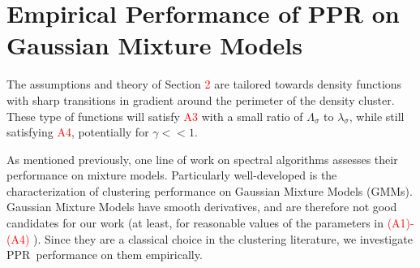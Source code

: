 \documentclass{article}
\newcommand{\1}{\mathbf{1}}
\newcommand{\pprspace}{{\sc PPR~}}
\theoremstyle{aldenthm}
\theoremstyle{aldenrmrk}
\begin{document}

\printAffiliationsAndNotice{}

\section{Empirical Performance of PPR on Gaussian Mixture Models}

The assumptions and theory of Section \textcolor{red}{2} are tailored towards density functions with sharp transitions in gradient around the perimeter of the density cluster. These type of functions will satisfy \textcolor{red}{A3} with a small ratio of $\Lambda_{\sigma}$ to $\lambda_{\sigma}$, while still satisfying \textcolor{red}{A4}, potentially for $\gamma << 1$. 

As mentioned previously, one line of work on spectral algorithms assesses their performance on mixture models. Particularly well-developed is the characterization of clustering performance on Gaussian Mixture Models (GMMs). Gaussian Mixture Models have smooth derivatives, and are therefore not good candidates for our work (at least, for reasonable values of the parameters in \textcolor{red}{(A1)-(A4)} ). Since they are a classical choice in the clustering literature, we investigate \pprspace performance on them empirically.
\end{document}
